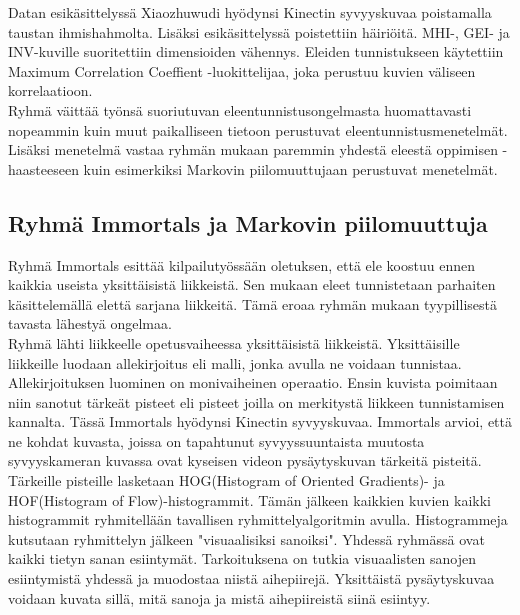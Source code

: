 Datan esikäsittelyssä Xiaozhuwudi hyödynsi Kinectin syvyyskuvaa poistamalla taustan ihmishahmolta. Lisäksi esikäsittelyssä poistettiin häiriöitä.
MHI-, GEI- ja INV-kuville suoritettiin dimensioiden vähennys. Eleiden tunnistukseen käytettiin Maximum Correlation Coeffient -luokittelijaa,
joka perustuu kuvien väliseen korrelaatioon. \citep {6239179}\\

Ryhmä väittää työnsä suoriutuvan eleentunnistusongelmasta huomattavasti nopeammin kuin muut paikalliseen tietoon perustuvat eleentunnistusmenetelmät.
Lisäksi menetelmä vastaa ryhmän mukaan paremmin yhdestä eleestä oppimisen -haasteeseen kuin esimerkiksi Markovin piilomuuttujaan perustuvat menetelmät.
\citep{firstround}

\subsection{Ryhmä Immortals ja Markovin piilomuuttuja}

Ryhmä Immortals esittää kilpailutyössään oletuksen, että ele koostuu ennen kaikkia useista yksittäisistä liikkeistä. 
Sen mukaan eleet tunnistetaan parhaiten käsittelemällä elettä sarjana liikkeitä. Tämä eroaa ryhmän mukaan tyypillisestä 
tavasta lähestyä ongelmaa.\citep {6239185}\\

Ryhmä lähti liikkeelle opetusvaiheessa yksittäisistä liikkeistä. Yksittäisille liikkeille luodaan allekirjoitus eli malli,
jonka avulla ne voidaan tunnistaa. Allekirjoituksen luominen on monivaiheinen operaatio. Ensin kuvista poimitaan niin sanotut
tärkeät pisteet eli pisteet joilla on merkitystä liikkeen tunnistamisen kannalta. Tässä Immortals hyödynsi Kinectin syvyyskuvaa.
Immortals arvioi, että ne kohdat kuvasta, joissa on tapahtunut syvyyssuuntaista muutosta syvyyskameran kuvassa ovat kyseisen videon pysäytyskuvan
tärkeitä pisteitä. Tärkeille pisteille lasketaan HOG(Histogram of Oriented Gradients)- ja HOF(Histogram of Flow)-histogrammit. 
Tämän jälkeen kaikkien kuvien kaikki histogrammit ryhmitellään tavallisen ryhmittelyalgoritmin avulla.
Histogrammeja kutsutaan ryhmittelyn jälkeen "visuaalisiksi sanoiksi". Yhdessä ryhmässä ovat kaikki tietyn sanan esiintymät.
Tarkoituksena on tutkia visuaalisten sanojen esiintymistä yhdessä ja muodostaa niistä aihepiirejä. 
Yksittäistä pysäytyskuvaa voidaan kuvata sillä, mitä sanoja ja mistä aihepiireistä siinä esiintyy.\citep {6239185}\\

